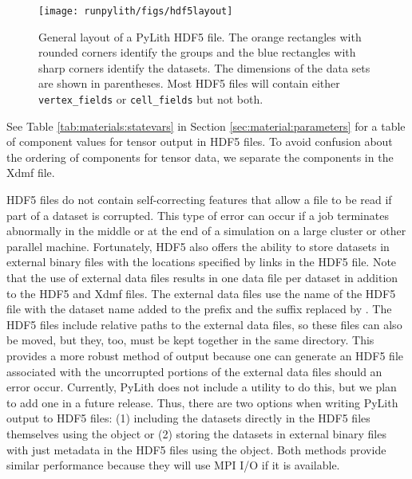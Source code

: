 
\begin{figure}[htbp]
  \texttt{[image: runpylith/figs/hdf5layout]}
  \caption{General layout of a PyLith HDF5 file. The orange rectangles
    with rounded corners identify the groups and the blue rectangles
    with sharp corners identify the datasets. The dimensions of the
    data sets are shown in parentheses. Most HDF5 files will contain
    either \texttt{vertex\_fields} or \texttt{cell\_fields} but not
    both.}
 \label{fig:hdf5:layout}
\end{figure}

See Table \vref{tab:materials:statevars} in Section
\vref{sec:material:parameters} for a table of component values for
tensor output in HDF5 files. To avoid confusion about the ordering of
components for tensor data, we separate the components in the Xdmf
file.

HDF5 files do not contain self-correcting features that allow a file
to be read if part of a dataset is corrupted. This type of error can
occur if a job terminates abnormally in the middle or at the end of a
simulation on a large cluster or other parallel machine. Fortunately,
HDF5 also offers the ability to store datasets in external binary
files with the locations specified by links in the HDF5 file. Note
that the use of external data files results in one data file per
dataset in addition to the HDF5 and Xdmf files. The external data
files use the name of the HDF5 file with the dataset name added to the
prefix and the  suffix replaced by . The
HDF5 files include relative paths to the external data files, so these
files can also be moved, but they, too, must be kept together in the
same directory. This provides a more robust method of output because
one can generate an HDF5 file associated with the uncorrupted portions
of the external data files should an error occur. Currently, PyLith
does not include a utility to do this, but we plan to add one in a
future release. Thus, there are two options when writing PyLith output
to HDF5 files: (1) including the datasets directly in the HDF5 files
themselves using the  object or (2) storing the
datasets in external binary files with just metadata in the HDF5 files
using the  object. Both methods provide
similar performance because they will use MPI I/O if it is available.

